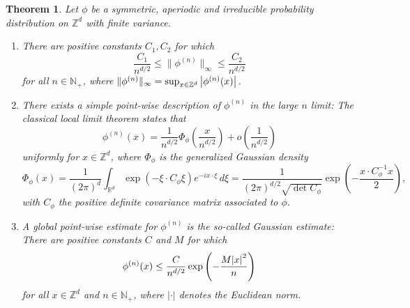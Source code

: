 \documentclass[11pt, letter]{book}
\newtheorem{theorem}{Theorem}[section]
\renewcommand\det{\operatorname{det}}
\newcommand{\lp}{\left(}
\newcommand{\rp}{\right)}
\newcommand{\f}[2]{\frac{#1}{#2}}
\begin{document}
\begin{framed}
\begin{theorem}\label{thm:localglobal}
Let $\phi$ be a symmetric, aperiodic and irreducible probability distribution on $\mathbb{Z}^d$ with finite variance.
\begin{enumerate}
    \item There are positive constants $C_1, C_2$ for which \begin{equation*}
        \f{C_1}{n^{d/2}} \leq \| \phi^{(n)} \|_\infty \leq \f{C_2}{n^{d/2}}
    \end{equation*}
    for all $n\in \mathbb{N}_+$, where $\| \phi^{(n)} \|_\infty = \sup_{x\in \mathbb{Z}^d} \abs{\phi^{(n)}(x)}$.
    
    \item There exists a simple point-wise description of $\phi^{(n)}$ in the large $n$ limit: The classical local limit theorem states that
    \begin{equation*}
        \phi^{(n)}(x) = \f{1}{n^{d/2}} \Phi_\phi \lp \f{x}{n^{d/2}} \rp + o\lp \f{1}{n^{d/2}} \rp
    \end{equation*}
    uniformly for $x\in \mathbb{Z}^d$, where $\Phi_\phi$ is the generalized Gaussian density
    \begin{equation*}
        \Phi_\phi(x) = \f{1}{(2\pi)^d} \int_{\mathbb{R}^d} \exp\lp -\xi \cdot C_\phi \xi \rp e^{-ix\cdot \xi}\,d\xi = \f{1}{(2\pi)^{d/2} \sqrt{\det C_\phi} }\exp \lp -\f{x\cdot C_\phi^{-1} x }{2} \rp,
    \end{equation*}
    with $C_\phi$ the positive definite covariance matrix associated to $\phi$. 
    
    \item A global point-wise estimate for $\phi^{(n)}$ is the so-called Gaussian estimate: There are positive constants $C$ and $M$ for which
    \begin{equation*}
        \phi^{(n)}(x) \leq \f{C}{n^{d/2}} \exp \lp -\f{M\abs{x}^2}{n} \rp
    \end{equation*}
    for all $x\in \mathbb{Z}^d$ and $n\in \mathbb{N}_+$, where $|\cdot|$ denotes the Euclidean norm. 
\end{enumerate}
\end{theorem}
\end{framed}
\end{document}
